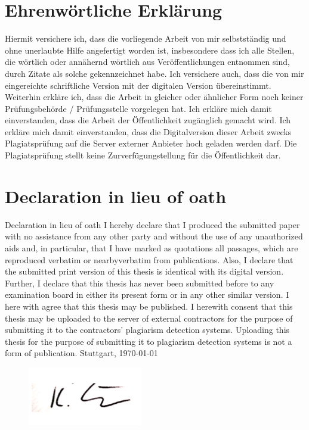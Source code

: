 \section*{Ehrenwörtliche Erklärung}
\thispagestyle{fancy}
Hiermit versichere ich, dass die vorliegende Arbeit von mir selbstständig und ohne unerlaubte Hilfe angefertigt worden ist, insbesondere dass ich alle Stellen, die wörtlich oder annähernd wörtlich aus Veröffentlichungen entnommen sind, durch Zitate als solche gekennzeichnet habe. Ich versichere auch, dass die von mir eingereichte schriftliche Version mit der digitalen Version übereinstimmt. Weiterhin erkläre ich, dass die Arbeit in gleicher oder ähnlicher Form noch keiner Prüfungsbehörde / Prüfungsstelle vorgelegen hat. Ich erkläre mich damit einverstanden, dass die Arbeit der Öffentlichkeit zugänglich gemacht wird. Ich erkläre mich damit einverstanden, dass die Digitalversion dieser Arbeit zwecks Plagiatsprüfung auf die Server externer Anbieter hoch geladen
werden darf. Die Plagiatsprüfung stellt keine Zurverfügungstellung für die Öffentlichkeit dar.
\section*{Declaration in lieu of oath}
Declaration in lieu of oath
I hereby declare that I produced the submitted paper with no assistance from any other party and without the use of any unauthorized aids and, in particular, that I have marked
as quotations all passages, which are reproduced verbatim or nearbyverbatim from publications. Also, I declare that the submitted print version of this thesis is identical with its digital version. Further, I declare that this thesis has never been submitted before to
any examination board in either its present form or in any other similar version. I here with agree that this thesis may be published. I herewith consent that this thesis may be
uploaded to the server of external contractors for the purpose of submitting it to the contractors’ plagiarism detection systems. Uploading this thesis for the purpose of submitting it to plagiarism detection systems is not a form of publication.
\linebreak
\linebreak
Stuttgart, \today
\begin{figure}[h]
    \includegraphics{./bilder/unterschrift}
\end{figure}
